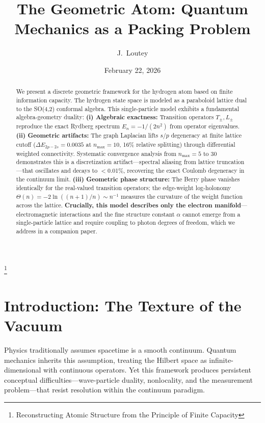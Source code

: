 \documentclass[aps,pra,twocolumn,superscriptaddress,longbibliography]{revtex4-2}
\begin{document}
\title{The Geometric Atom: Quantum Mechanics as a Packing Problem}
\thanks{Reconstructing Atomic Structure from the Principle of Finite Capacity}

\author{J.~Loutey}

\date{February 22, 2026}

\begin{abstract}
We present a discrete geometric framework for the hydrogen atom based on finite information capacity. The hydrogen state space is modeled as a paraboloid lattice dual to the SO(4,2) conformal algebra. This single-particle model exhibits a fundamental algebra-geometry duality: \textbf{(i) Algebraic exactness:} Transition operators $T_\pm, L_\pm$ reproduce the exact Rydberg spectrum $E_n = -1/(2n^2)$ from operator eigenvalues. \textbf{(ii) Geometric artifacts:} The graph Laplacian lifts $s/p$ degeneracy at finite lattice cutoff ($\Delta E_{2p-2s} = 0.0035$ at $n_{\max}=10$, 16\% relative splitting) through differential weighted connectivity. Systematic convergence analysis from $n_{\max}=5$ to 30 demonstrates this is a discretization artifact---spectral aliasing from lattice truncation---that oscillates and decays to $<$0.01\%, recovering the exact Coulomb degeneracy in the continuum limit. \textbf{(iii) Geometric phase structure:} The Berry phase vanishes identically for the real-valued transition operators; the edge-weight log-holonomy $\Theta(n) = -2\ln((n{+}1)/n) \sim n^{-1}$ measures the curvature of the weight function across the lattice. \textbf{Crucially, this model describes only the electron manifold}---electromagnetic interactions and the fine structure constant $\alpha$ cannot emerge from a single-particle lattice and require coupling to photon degrees of freedom, which we address in a companion paper.
\end{abstract}

\maketitle

\section{Introduction: The Texture of the Vacuum}

Physics traditionally assumes spacetime is a smooth continuum. Quantum mechanics inherits this assumption, treating the Hilbert space as infinite-dimensional with continuous operators. Yet this framework produces persistent conceptual difficulties---wave-particle duality, nonlocality, and the measurement problem---that resist resolution within the continuum paradigm.
\end{document}
